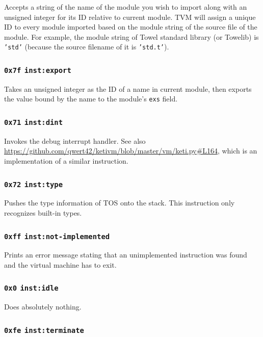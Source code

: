 \documentclass{article}
\newcommand{\inst}[1] {\texttt{inst:#1}}
\begin{document}
Accepts a string of the name of the module you wish to import along with an unsigned integer for its ID relative to current module. TVM will assign a unique ID to every module imported based on the module string of the source file of the module. For example, the module string of Towel standard library (or Towelib) is \texttt{'std'} (because the source filename of it is \texttt{'std.t'}).

\subsubsection{\texttt{0x7f} \inst{export}}

Takes an unsigned integer as the ID of a name in current module, then exports the value bound by the name to the module's \texttt{exs} field.

\subsubsection{\texttt{0x71} \inst{dint}}

Invokes the debug interrupt handler. See also \url{https://github.com/qwert42/ketivm/blob/master/vm/keti.py#L164}, which is an implementation of a similar instruction.

\subsubsection{\texttt{0x72} \inst{type}}

Pushes the type information of TOS onto the stack. This instruction only recognizes built-in types.

\subsubsection{\texttt{0xff} \inst{not-implemented}}

Prints an error message stating that an unimplemented instruction was found and the virtual machine has to exit.

\subsubsection{\texttt{0x0} \inst{idle}}

Does absolutely nothing.

\subsubsection{\texttt{0xfe} \inst{terminate}}
\end{document}
